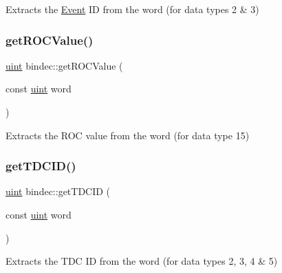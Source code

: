 Extracts the \hyperlink{class_event}{Event} ID from the word (for data types 2 \& 3) 

\mbox{\label{namespacebindec_abfc242c82f0a7301671ec270bce57681}} 
\subsubsection{\texorpdfstring{get\+R\+O\+C\+Value()}{getROCValue()}}
{\footnotesize\ttfamily \hyperlink{namespacebindec_a61700e6ffcfc677215bfdf223803e735}{uint} bindec\+::get\+R\+O\+C\+Value (\begin{DoxyParamCaption}\item[{const \hyperlink{namespacebindec_a61700e6ffcfc677215bfdf223803e735}{uint}}]{word }\end{DoxyParamCaption})\hspace{0.3cm}{\ttfamily [inline]}}



Extracts the R\+OC value from the word (for data type 15) 

\mbox{\label{namespacebindec_a05afce2b4e8802eeb8b452bc1ec6de8b}} 
\subsubsection{\texorpdfstring{get\+T\+D\+C\+I\+D()}{getTDCID()}}
{\footnotesize\ttfamily \hyperlink{namespacebindec_a61700e6ffcfc677215bfdf223803e735}{uint} bindec\+::get\+T\+D\+C\+ID (\begin{DoxyParamCaption}\item[{const \hyperlink{namespacebindec_a61700e6ffcfc677215bfdf223803e735}{uint}}]{word }\end{DoxyParamCaption})\hspace{0.3cm}{\ttfamily [inline]}}



Extracts the T\+DC ID from the word (for data types 2, 3, 4 \& 5) 

\mbox{\label{namespacebindec_ac7187bee4c7ad4848739d66e16a0f3e2}} 
